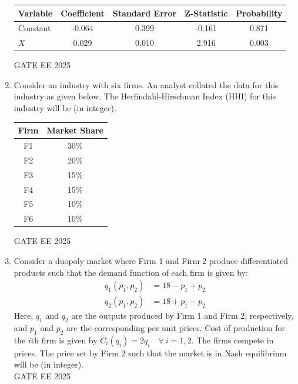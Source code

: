 \documentclass[journal,12pt,onecolumn]{IEEEtran}
\theoremstyle{remark}
\begin{document}
\begin{enumerate}
\begin{center}
\begin{tabular}{|l|c|c|c|c|}
\hline
Variable & Coefficient & Standard Error & Z-Statistic & Probability \\
\hline
Constant & -0.064 & 0.399 & -0.161 & 0.871 \\
$X$ & 0.029 & 0.010 & 2.916 & 0.003 \\
\hline
\end{tabular}
\end{center}
GATE EE 2025\\
\item Consider an industry with six firms. An analyst collated the data for this industry as given below. The Herfindahl-Hirschman Index (HHI) for this industry will be \underline{\hspace{2cm}} (in integer).
\begin{center}
\begin{tabular}{|c|c|}
\hline
Firm & Market Share \\
\hline
F1 & 30\% \\
F2 & 20\% \\
F3 & 15\% \\
F4 & 15\% \\
F5 & 10\% \\
F6 & 10\% \\
\hline
\end{tabular}
\end{center} 
GATE EE 2025\\
\item Consider a duopoly market where Firm 1 and Firm 2 produce differentiated products such that the demand function of each firm is given by:
\begin{align*}
q_1(p_1, p_2) &= 18 - p_1 + p_2 \\
q_2(p_1, p_2) &= 18 + p_1 - p_2
\end{align*}
Here, $q_1$ and $q_2$ are the outputs produced by Firm 1 and Firm 2, respectively, and $p_1$ and $p_2$ are the corresponding per unit prices. Cost of production for the $i$th firm is given by $C_i(q_i) = 2q_i \quad \forall~i=1,2$. The firms compete in prices. The price set by Firm 2 such that the market is in Nash equilibrium will be \underline{\hspace{2cm}} (in integer).\\

GATE EE 2025\\
\end{enumerate}
\renewcommand{\thefigure}{\theenumi}
\renewcommand{\thetable}{\theenumi}
\end{document}
